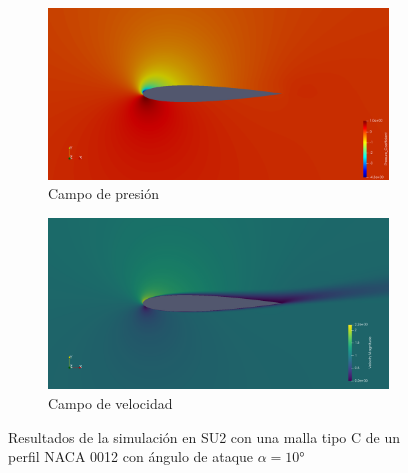 \documentclass[letterpaper, openright, 12pt]{book}
\begin{document}
    \begin{figure}[htbp!]
        \centering
        \begin{subfigure}[c]{0.48\textwidth}
            \includegraphics[keepaspectratio, width=0.99\textwidth]
                {./img/su2/mc_cp_alfa_10}
            \caption{Campo de presión}
            \label{fig:mc_cp_10}
        \end{subfigure}
        \begin{subfigure}[c]{0.48\textwidth}
            \includegraphics[keepaspectratio, width=0.99\textwidth]
                {./img/su2/mc_vel_alfa_10}
            \caption{Campo de velocidad}
            \label{fig:mc_vel_10}
        \end{subfigure}
        \caption[Resultados de simulaciones para malla tipo C en
            SU2]{Resultados de la simulación en SU2 con una malla tipo C de un
            perfil NACA 0012 con ángulo de ataque $\alpha = 10\si{\degree}$}
        \label{fig:mc_su2_10}
    \end{figure}
\end{document}
